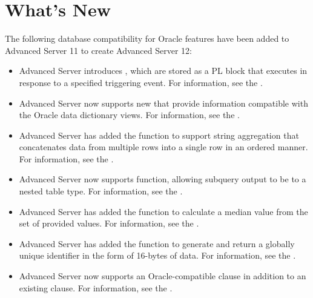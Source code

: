 \documentclass[letterpaper,10pt,english,openany,oneside]{sphinxmanual}
\begin{document}
\section{What’s New}
\label{\detokenize{introduction:whats-new}}
The following database compatibility for Oracle features have been added
to Advanced Server 11 to create Advanced Server 12:
\begin{itemize}
\item {} 
Advanced Server introduces , which are stored as a
PL block that executes in response to a specified triggering event.
For information, see the .

\item {} 
Advanced Server now supports new  that provide
information compatible with the Oracle data dictionary views. For
information, see the .

\item {} 
Advanced Server has added the  function to support string
aggregation that concatenates data from multiple rows into a single
row in an ordered manner. For information, see the .

\item {} 
Advanced Server now supports  function, allowing
subquery output to be  to a nested table type. For information,
see the .

\item {} 
Advanced Server has added the  function to calculate a median
value from the set of provided values. For information, see the
.

\item {} 
Advanced Server has added the  function to generate and
return a globally unique identifier in the form of 16-bytes of 
data. For information, see the .

\item {} 
Advanced Server now supports an Oracle-compatible 
clause in addition to an existing  clause. For
information, see the .


\end{itemize}
\end{document}
